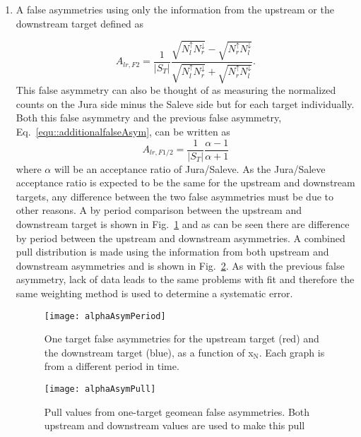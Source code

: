 \begin{enumerate}
\item A false asymmetries using only the information from the upstream or the
  downstream target defined as

  \begin{equation}
    \label{equ::falseANgeomean}
    A_{lr, F2} =
    \frac{1}{|S_T|}
    \frac{\sqrt{N_l^\uparrow N_r^\downarrow}
      - \sqrt{N_r^\uparrow N_l^\downarrow}
    }{
      \sqrt{N_l^\uparrow N_r^\downarrow}
      + \sqrt{N_r^\uparrow N_l^\downarrow}
    }.
  \end{equation}
  This false asymmetry can also be thought of as measuring the normalized counts
  on the Jura side minus the Saleve side but for each target individually.  Both
  this false asymmetry and the previous false asymmetry,
  Eq.~\ref{equ::additionalfalseAsym}, can be written as
  \begin{equation}
    A_{lr,F1/2} =
    \frac{1}{|S_T|}
    \frac{\alpha - 1}{\alpha + 1}
  \end{equation}
  where $\alpha$ will be an acceptance ratio of Jura/Saleve.  As the Jura/Saleve
  acceptance ratio is expected to be the same for the upstream and downstream
  targets, any difference between the two false asymmetries must be due to other
  reasons.  A by period comparison between the upstream and downstream target is
  shown in Fig.~\ref{fig::alphaAsymPeriod} and as can be seen there are
  difference by period between the upstream and downstream asymmetries.  A
  combined pull distribution is made using the information from both upstream
  and downstream asymmetries and is shown in Fig.~\ref{fig::alphaAsymPull}.  As
  with the previous false asymmetry, lack of data leads to the same problems
  with fit and therefore the same weighting method is used to determine a
  systematic error.

  \begin{figure}[h!t]
    \centering \texttt{[image: alphaAsymPeriod]}
    \caption{One target false asymmetries for the upstream target (red) and the
      downstream target (blue), as a function of x$_{\mathrm{N}}$.  Each graph
      is from a different period in time.}
    \label{fig::alphaAsymPeriod}
  \end{figure}

  \begin{figure}[h!t]
    \centering
    \texttt{[image: alphaAsymPull]}
    \caption{Pull values from one-target geomean false asymmetries.  Both
      upstream and downstream values are used to make this pull}
    \label{fig::alphaAsymPull}
  \end{figure}


\end{enumerate}
